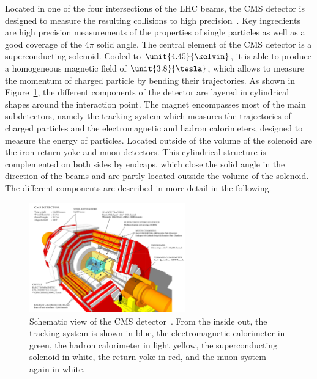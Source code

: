 Located in one of the four intersections of the LHC beams, the CMS detector is designed to measure the resulting collisions to high precision~\cite{CMS}. Key ingredients are high precision measurements of the properties of single particles as well as a good coverage of the 4$\pi$ solid angle. The central element of the CMS detector is a superconducting solenoid. Cooled to $\unit{4.45}{\kelvin}$, it is able to produce a homogeneous magnetic field of $\unit{3.8}{\tesla}$, which allows to measure the momentum of charged particle by bending their trajectories. As shown in Figure~\ref{fig:CMS}, the different components of the detector are layered in cylindrical shapes around the interaction point. The magnet encompasses most of the main subdetectors, namely the tracking system which measures the trajectories of charged particles and the electromagnetic and hadron calorimeters, designed to measure the energy of particles. Located outside of the volume of the solenoid are the iron return yoke and muon detectors. This cylindrical structure is complemented on both sides by endcaps, which close the solid angle in the direction of the beams and are partly located outside the volume of the solenoid. The different components are described in more detail in the following. 
\begin{figure}[htbp]
\centering
  \includegraphics[width=0.6\textwidth]{plots/CMS/cms_design.png}
\caption{Schematic view of the CMS detector~\cite{CMSScetch}. From the inside out, the tracking system is shown in blue, the electromagnetic calorimeter in green, the hadron calorimeter in light yellow, the superconducting solenoid in white, the return yoke in red, and the muon system again in white.}
\label{fig:CMS}
\end{figure}

